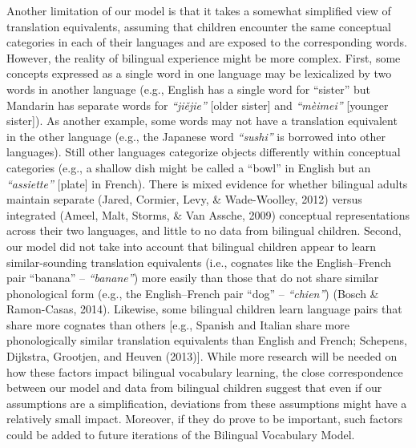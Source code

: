 \documentclass[
  english,
  ,man,floatsintext]{apa6}
\begin{document}
Another limitation of our model is that it takes a somewhat simplified view of translation equivalents, assuming that children encounter the same conceptual categories in each of their languages and are exposed to the corresponding words. However, the reality of bilingual experience might be more complex. First, some concepts expressed as a single word in one language may be lexicalized by two words in another language (e.g., English has a single word for ``sister'' but Mandarin has separate words for \emph{``jiějie''} {[}older sister{]} and \emph{``mèimei''} {[}younger sister{]}). As another example, some words may not have a translation equivalent in the other language (e.g., the Japanese word \emph{``sushi''} is borrowed into other languages). Still other languages categorize objects differently within conceptual categories (e.g., a shallow dish might be called a ``bowl'' in English but an \emph{``assiette''} {[}plate{]} in French). There is mixed evidence for whether bilingual adults maintain separate (Jared, Cormier, Levy, \& Wade-Woolley, 2012) versus integrated (Ameel, Malt, Storms, \& Van Assche, 2009) conceptual representations across their two languages, and little to no data from bilingual children. Second, our model did not take into account that bilingual children appear to learn similar-sounding translation equivalents (i.e., cognates like the English--French pair ``banana'' -- \emph{``banane''}) more easily than those that do not share similar phonological form (e.g., the English--French pair ``dog'' -- \emph{``chien''}) (Bosch \& Ramon-Casas, 2014). Likewise, some bilingual children learn language pairs that share more cognates than others {[}e.g., Spanish and Italian share more phonologically similar translation equivalents than English and French; Schepens, Dijkstra, Grootjen, and Heuven (2013){]}. While more research will be needed on how these factors impact bilingual vocabulary learning, the close correspondence between our model and data from bilingual children suggest that even if our assumptions are a simplification, deviations from these assumptions might have a relatively small impact. Moreover, if they do prove to be important, such factors could be added to future iterations of the Bilingual Vocabulary Model.
\end{document}
